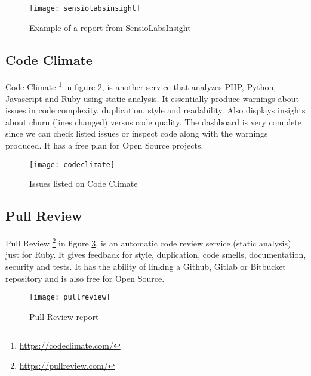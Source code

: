 \begin{figure}[H]
    \begin{center}
        \texttt{[image: sensiolabsinsight]}
        \caption{Example of a report from SensioLabsInsight}
        \label{figure:sensiolabsinsight}
    \end{center}
\end{figure}

\subsection{Code Climate}
Code Climate \footnote{\url{https://codeclimate.com/}} in figure
\ref{figure:codeclimate}, is another service that analyzes PHP, Python,
Javascript and Ruby using static analysis. It essentially produce warnings about
issues in code complexity, duplication, style and readability. Also displays
insights about churn (lines changed) versus code quality. The dashboard is very
complete since we can check listed issues or inspect code along with the
warnings produced. It has a free plan for Open Source projects.

\begin{figure}[H]
    \begin{center}
        \texttt{[image: codeclimate]}
        \caption{Issues listed on Code Climate}
        \label{figure:codeclimate}
    \end{center}
\end{figure}

\subsection{Pull Review}
Pull Review \footnote{\url{https://pullreview.com/}} in figure
\ref{figure:pullreview}, is an automatic code review service (static analysis)
just for Ruby. It gives feedback for style, duplication, code smells,
documentation, security and tests. It has the ability of linking a Github,
Gitlab or Bitbucket repository and is also free for Open Source.

\begin{figure}[H]
    \begin{center}
        \texttt{[image: pullreview]}
        \caption{Pull Review report}
        \label{figure:pullreview}
    \end{center}
\end{figure}
